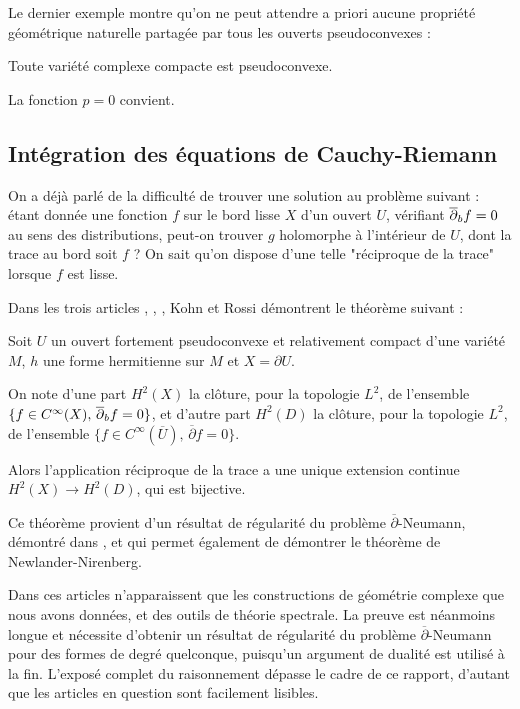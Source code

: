 Le dernier exemple montre qu'on ne peut attendre a priori aucune propriété géométrique naturelle partagée par tous les ouverts pseudoconvexes :
\begin{exemple}
Toute variété complexe compacte est pseudoconvexe.
\end{exemple}
\begin{preuve}
La fonction $p=0$ convient.
\end{preuve}
\subsection{Intégration des équations de Cauchy-Riemann}
On a déjà parlé de la difficulté de trouver une solution au problème suivant : étant donnée une fonction $f$ sur le bord lisse $X$ d'un ouvert $U$, vérifiant $\overline{\partial}_b f =0$ au sens des distributions, peut-on trouver $g$ holomorphe à l'intérieur de $U$, dont la trace au bord soit $f$ ? On sait qu'on dispose d'une telle "réciproque de la trace" lorsque $f$ est lisse.

Dans les trois articles \cite{kohn1963harmonic}, \cite{kohn1964harmonic}, \cite{kohn1965extension}, Kohn et Rossi démontrent le théorème suivant :
\begin{theorem}[Kohn]\label{thm:annexe}
Soit $U$ un ouvert fortement pseudoconvexe et relativement compact d'une variété $M$, $h$ une forme hermitienne sur $M$ et $X=\partial U$.

On note d'une part $H^2(X)$ la clôture, pour la topologie $L^2$, de l'ensemble $\{f \in C^{\infty}(X),\,\overline{\partial}_b f =0\}$, et d'autre part $H^2(D)$ la clôture, pour la topologie $L^2$, de l'ensemble $\{f \in C^{\infty}(\overline{U}),\,\overline{\partial}f =0\}$.

Alors l'application réciproque de la trace a une unique extension continue $H^2(X)\to H^2(D)$, qui est bijective.
\end{theorem}
Ce théorème provient d'un résultat de régularité du problème $\overline{\partial}$-Neumann, démontré dans \cite{kohn1964harmonic}, et qui permet également de démontrer le théorème de Newlander-Nirenberg.

Dans ces articles n'apparaissent que les constructions de géométrie complexe que nous avons données, et des outils de théorie spectrale. La preuve est néanmoins longue et nécessite d'obtenir un résultat de régularité du problème $\overline{\partial}$-Neumann pour des formes de degré quelconque, puisqu'un argument de dualité est utilisé à la fin. L'exposé complet du raisonnement dépasse le cadre de ce rapport, d'autant que les articles en question sont facilement lisibles.

